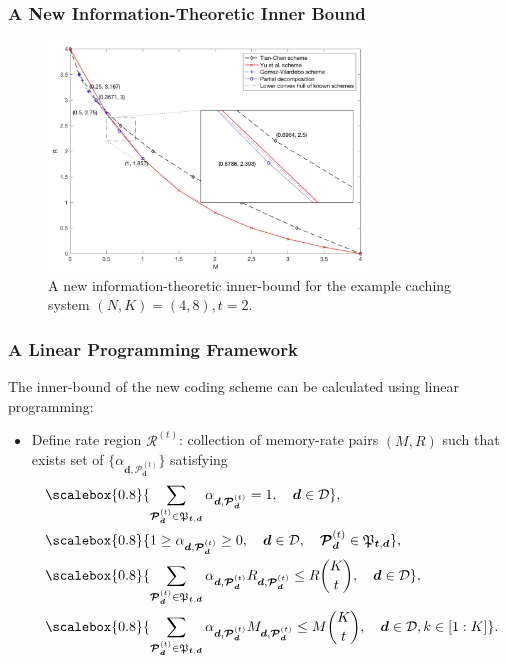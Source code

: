 \documentclass{beamer}
\newcommand\scalemath[2]{\scalebox{#1}{\mbox{\ensuremath{\displaystyle #2}}}}
\begin{document}
\begin{frame}
\frametitle{A New Information-Theoretic Inner Bound}
\begin{figure}[]
\centering
\includegraphics[width=8.5cm]{plot48.pdf}
\caption{\label{fig:system}A new information-theoretic inner-bound for the example caching system $(N,K)=(4,8), t=2$.}
\end{figure}
\end{frame}
\begin{frame}
\frametitle{A Linear Programming Framework}
The inner-bound of the new coding scheme can be calculated using linear programming:
\begin{itemize}
\item Define rate region $\mathcal{R}^{(t)}$: collection of memory-rate pairs $(M,R)$ such that exists set of $\{\alpha_{\boldsymbol{d},\boldsymbol{\mathcal{P}}_{\boldsymbol{d}}^{(t)}}\}$ satisfying
\begin{align*}
& \scalemath{0.8}{\sum_{\boldsymbol{\mathcal{P}}_{\boldsymbol{d}}^{(t)} \in \mathfrak{P}_{\boldsymbol{t},\boldsymbol{d}}}\alpha_{\boldsymbol{d},\boldsymbol{\mathcal{P}}_{\boldsymbol{d}}^{(t)}}=1, \quad \boldsymbol{d} \in \mathcal{D}}, \\
& \scalemath{0.8}{1 \geq \alpha_{\boldsymbol{d},\boldsymbol{\mathcal{P}}_{\boldsymbol{d}}^{(t)}} \geq 0, \quad \boldsymbol{d} \in \mathcal{D}, \quad \boldsymbol{\mathcal{P}}_{\boldsymbol{d}}^{(t)} \in \mathfrak{P}_{\boldsymbol{t},\boldsymbol{d}}}, \\
& \scalemath{0.8}{\sum_{\boldsymbol{\mathcal{P}}_{\boldsymbol{d}}^{(t)} \in \mathfrak{P}_{\boldsymbol{t},\boldsymbol{d}}} \alpha_{\boldsymbol{d},\boldsymbol{\mathcal{P}}_{\boldsymbol{d}}^{(t)}} R_{\boldsymbol{d},\boldsymbol{\mathcal{P}}_{\boldsymbol{d}}^{(t)}} \leq R\binom{K}{t}, \quad \boldsymbol{d} \in \mathcal{D}}, \\
& \scalemath{0.8}{\sum_{\boldsymbol{\mathcal{P}}_{\boldsymbol{d}}^{(t)} \in \mathfrak{P}_{\boldsymbol{t},\boldsymbol{d}}} \alpha_{\boldsymbol{d},\boldsymbol{\mathcal{P}}_{\boldsymbol{d}}^{(t)}} M_{\boldsymbol{d},\boldsymbol{\mathcal{P}}_{\boldsymbol{d}}^{(t)}} \leq M\binom{K}{t}, \quad \boldsymbol{d} \in \mathcal{D}, k \in [1:K]}.
\end{align*}
\end{itemize}
\end{frame}
\end{document}
